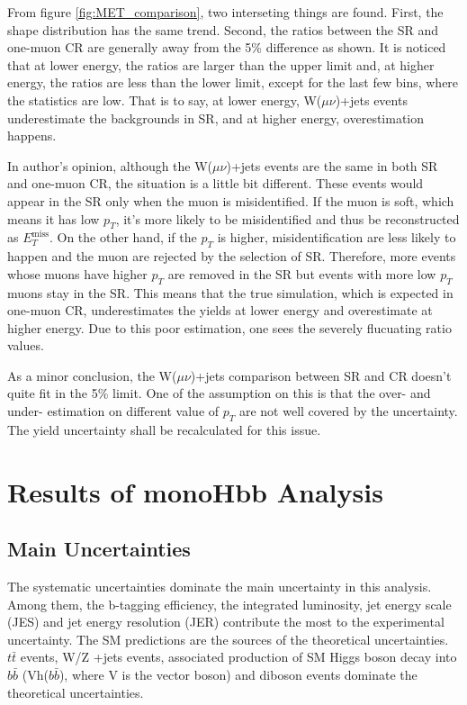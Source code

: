 \documentclass[class=NCU_thesis, crop=false]{standalone}
\begin{document}
		
		From figure \ref{fig:MET_comparison}, two interseting things are found. First, the shape distribution has the same trend. Second, the ratios between the SR and one-muon CR are generally away from the 5\% difference as shown.  It is noticed that at lower energy, the ratios are larger than the upper limit and, at higher energy, the ratios are less than the lower limit, except for the last few bins, where the statistics are low. That is to say, at lower energy, W($\mu \nu$)+jets events underestimate the backgrounds in SR, and at higher energy, overestimation happens.
		
		In author's opinion, although the W($\mu \nu$)+jets events are the same in both SR and one-muon CR, the situation is a little bit different. These events would appear in the SR only when the muon is misidentified. If the muon is soft, which means it has low $p_T$, it's more likely to be misidentified and thus be reconstructed as $E_T^{\mathrm{miss}}$. On the other hand, if the $p_T$ is higher, misidentification are less likely to happen and the muon are rejected by the selection of SR. Therefore, more events whose muons have higher $p_T$ are removed in the SR but events with more low $p_T$ muons stay in the SR. This means that the true simulation, which is expected in one-muon CR, underestimates the yields at lower energy and overestimate at higher energy. Due to this poor estimation, one sees the severely flucuating ratio values.
		
		As a minor conclusion, the W($\mu \nu$)+jets comparison between SR and CR doesn't quite fit in the 5\% limit. One of the assumption on this is that the over- and under- estimation on different value of $p_T$ are not well covered by the uncertainty. The yield uncertainty shall be recalculated for this issue.

\chapter{Results of monoHbb Analysis}

\section{Main Uncertainties}
	The systematic uncertainties dominate the main uncertainty in this analysis. Among them, the b-tagging efficiency, the integrated luminosity, jet energy scale (JES) and jet energy resolution (JER) contribute the most to the experimental uncertainty. The SM predictions are the sources of the theoretical uncertainties. $t\bar{t}$ events, W/Z +jets events, associated production of SM Higgs boson decay into $b\bar{b}$ (Vh($b\bar{b}$), where V is the vector boson) and diboson events dominate the theoretical uncertainties.
	
\end{document}
